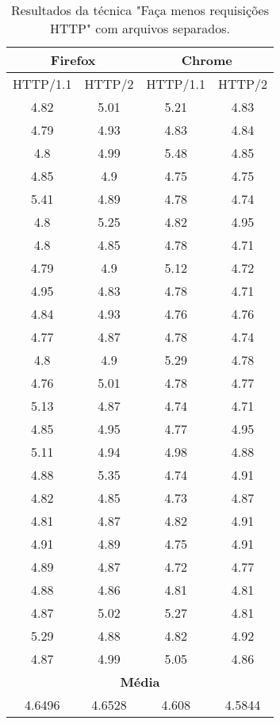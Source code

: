 \begin{table}[H]
	\centering
	\caption{Resultados da técnica "Faça menos requisições HTTP" com arquivos separados.}
	\label{resultados-facamenosrequisicoeshttp-separados}
	\begin{tabular}{cccc}
		\hline
		\multicolumn{2}{c}{\textbf{Firefox}} & \multicolumn{2}{c}{\textbf{Chrome}} \\
		\hline
		HTTP/1.1 & HTTP/2 & HTTP/1.1 & HTTP/2 \\
		\hline
		4.82 & 5.01 & 5.21 & 4.83 \\
		4.79 & 4.93 & 4.83 & 4.84 \\
		4.8  & 4.99 & 5.48 & 4.85 \\
		4.85 & 4.9  & 4.75 & 4.75 \\
		5.41 & 4.89 & 4.78 & 4.74 \\
		4.8  & 5.25 & 4.82 & 4.95 \\
		4.8  & 4.85 & 4.78 & 4.71 \\
		4.79 & 4.9  & 5.12 & 4.72 \\
		4.95 & 4.83 & 4.78 & 4.71 \\
		4.84 & 4.93 & 4.76 & 4.76 \\
		4.77 & 4.87 & 4.78 & 4.74 \\
		4.8  & 4.9  & 5.29 & 4.78 \\
		4.76 & 5.01 & 4.78 & 4.77 \\
		5.13 & 4.87 & 4.74 & 4.71 \\
		4.85 & 4.95 & 4.77 & 4.95 \\
		5.11 & 4.94 & 4.98 & 4.88 \\
		4.88 & 5.35 & 4.74 & 4.91 \\
		4.82 & 4.85 & 4.73 & 4.87 \\
		4.81 & 4.87 & 4.82 & 4.91 \\
		4.91 & 4.89 & 4.75 & 4.91 \\
		4.89 & 4.87 & 4.72 & 4.77 \\
		4.88 & 4.86 & 4.81 & 4.81 \\
		4.87 & 5.02 & 5.27 & 4.81 \\
		5.29 & 4.88 & 4.82 & 4.92 \\
		4.87 & 4.99 & 5.05 & 4.86 \\
		\hline
		\multicolumn{4}{c}{\textbf{Média}} \\
		4.6496 & 4.6528 & 4.608 & 4.5844 \\
		\hline
	\end{tabular}
\end{table}